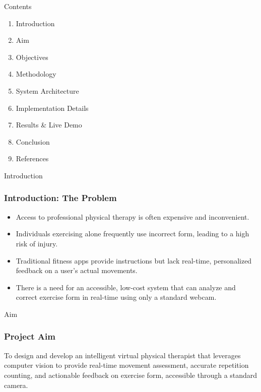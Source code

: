 \documentclass[10pt]{beamer}
\begin{document}
\begin{frame}{Contents}
    \begin{enumerate}
        \item Introduction
        \item Aim
        \item Objectives
        \item Methodology
        \item System Architecture
        \item Implementation Details
        \item Results \& Live Demo
        \item Conclusion
        \item References
    \end{enumerate}
\end{frame}


\begin{frame}{Introduction}
    \frametitle{Introduction: The Problem}
    \begin{itemize}
        \item Access to professional physical therapy is often expensive and inconvenient.\vspace{0.5em}
        \item Individuals exercising alone frequently use incorrect form, leading to a high risk of injury.\vspace{0.5em}
        \item Traditional fitness apps provide instructions but lack real-time, personalized feedback on a user's actual movements.\vspace{0.5em}
        \item There is a need for an accessible, low-cost system that can analyze and correct exercise form in real-time using only a standard webcam.
    \end{itemize}
\end{frame}


\begin{frame}{Aim}
    \frametitle{Project Aim}
    To design and develop an intelligent virtual physical therapist that leverages computer vision to provide real-time movement assessment, accurate repetition counting, and actionable feedback on exercise form, accessible through a standard camera.
\end{frame}
\end{document}
